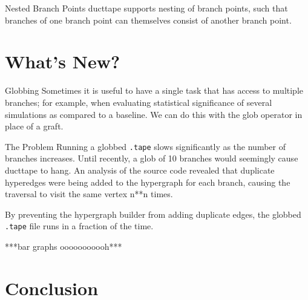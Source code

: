 \documentclass[10pt]{beamer}
\begin{document}
\begin{frame}[fragile]{Nested Branch Points}
ducttape supports nesting of branch points, such that branches of one branch point can themselves consist of another branch point.
\end{frame}

\section{What's New?}

\begin{frame}[fragile]{Globbing}
Sometimes it is useful to have a single task that has access to multiple branches; for example, when evaluating statistical significance of several simulations as compared to a baseline. We can do this with the glob operator in place of a graft.
\end{frame}

\begin{frame}[fragile]{The Problem}
Running a globbed \texttt{.tape} slows significantly as the number of branches increases. Until recently, a glob of 10 branches would seemingly cause ducttape to hang. An analysis of the source code revealed that duplicate hyperedges were being added to the hypergraph for each branch, causing the traversal to visit the same vertex n**n times.

By preventing the hypergraph builder from adding duplicate edges, the globbed \texttt{.tape} file runs in a fraction of the time.

***bar graphs ooooooooooh***

\end{frame}

\section{Conclusion}
\end{document}
